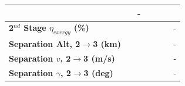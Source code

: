 \begin{table}[ht]
\begin{tabular}{l c c c c c c}
		& \firstsecondSeparationgammaISPThreeOneHundredTen
		& -
		\\
		\hline 
		\textbf{2$^{nd}$ Stage $\eta_{exergy}$ (\%)}
		& \textbf{\secondExergyEffISPThreeNinety}
		& \textbf{\secondExergyEffISPThreeNinetyFive}
		& \textbf{\secondExergyEffISPThreeStandard}
		& \textbf{\secondExergyEffISPThreeOneHundredFive}
		& \textbf{\secondExergyEffISPThreeOneHundredTen}
		& -
		\\
		\textbf{Separation Alt, 2$\rightarrow$3 (km)}
		& \secondthirdSeparationAltISPThreeNinety
		& \secondthirdSeparationAltISPThreeNinetyFive
		& \secondthirdSeparationAltISPThreeStandard
		& \secondthirdSeparationAltISPThreeOneHundredFive
		& \secondthirdSeparationAltISPThreeOneHundredTen
		& -
		\\
		\textbf{Separation $v$, 2$\rightarrow$3 (m/s)}
		& \secondthirdSeparationvISPThreeNinety
		& \secondthirdSeparationvISPThreeNinetyFive
		& \secondthirdSeparationvISPThreeStandard
		& \secondthirdSeparationvISPThreeOneHundredFive
		& \secondthirdSeparationvISPThreeOneHundredTen
		& -
		\\
		\textbf{Separation $\gamma$, 2$\rightarrow$3 (deg)}
		& \secondthirdSeparationgammaISPThreeNinety
		& \secondthirdSeparationgammaISPThreeNinetyFive
		& \secondthirdSeparationgammaISPThreeStandard
		& \secondthirdSeparationgammaISPThreeOneHundredFive
		& \secondthirdSeparationgammaISPThreeOneHundredTen
		& -
		\\
	

\end{tabular}
\end{table}
